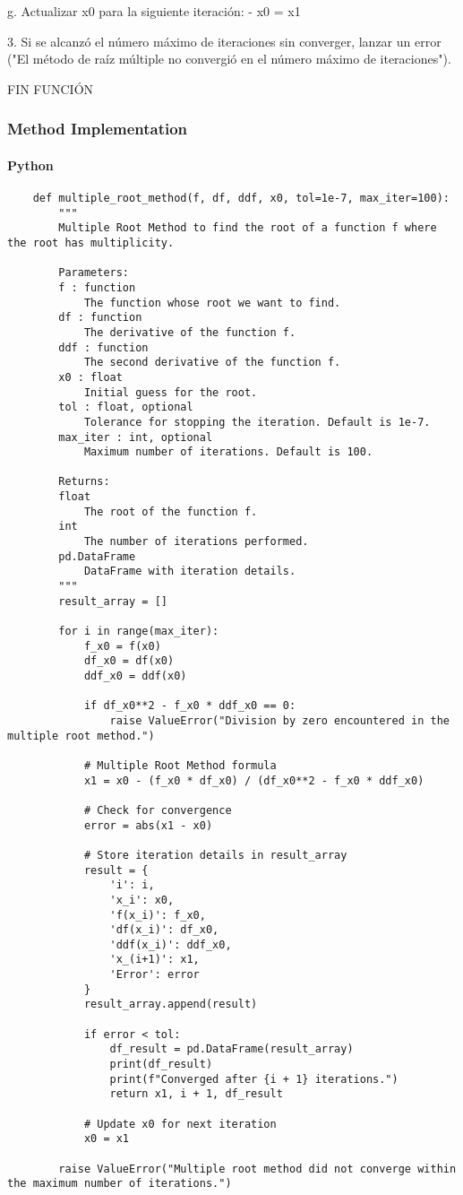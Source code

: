 \documentclass{article}
\begin{document}
        g. Actualizar x0 para la siguiente iteración:
           - x0 = x1

    3. Si se alcanzó el número máximo de iteraciones sin converger, lanzar un error ("El método de raíz múltiple no convergió en el número máximo de iteraciones").

FIN FUNCIÓN

        \subsubsection{Method Implementation}
            \paragraph{Python}
                \begin{verbatim}
    def multiple_root_method(f, df, ddf, x0, tol=1e-7, max_iter=100):
        """
        Multiple Root Method to find the root of a function f where the root has multiplicity.

        Parameters:
        f : function
            The function whose root we want to find.
        df : function
            The derivative of the function f.
        ddf : function
            The second derivative of the function f.
        x0 : float
            Initial guess for the root.
        tol : float, optional
            Tolerance for stopping the iteration. Default is 1e-7.
        max_iter : int, optional
            Maximum number of iterations. Default is 100.

        Returns:
        float
            The root of the function f.
        int
            The number of iterations performed.
        pd.DataFrame
            DataFrame with iteration details.
        """
        result_array = []

        for i in range(max_iter):
            f_x0 = f(x0)
            df_x0 = df(x0)
            ddf_x0 = ddf(x0)

            if df_x0**2 - f_x0 * ddf_x0 == 0:
                raise ValueError("Division by zero encountered in the multiple root method.")

            # Multiple Root Method formula
            x1 = x0 - (f_x0 * df_x0) / (df_x0**2 - f_x0 * ddf_x0)

            # Check for convergence
            error = abs(x1 - x0)

            # Store iteration details in result_array
            result = {
                'i': i,
                'x_i': x0,
                'f(x_i)': f_x0,
                'df(x_i)': df_x0,
                'ddf(x_i)': ddf_x0,
                'x_(i+1)': x1,
                'Error': error
            }
            result_array.append(result)

            if error < tol:
                df_result = pd.DataFrame(result_array)
                print(df_result)
                print(f"Converged after {i + 1} iterations.")
                return x1, i + 1, df_result

            # Update x0 for next iteration
            x0 = x1

        raise ValueError("Multiple root method did not converge within the maximum number of iterations.")
                \end{verbatim}
\end{document}
